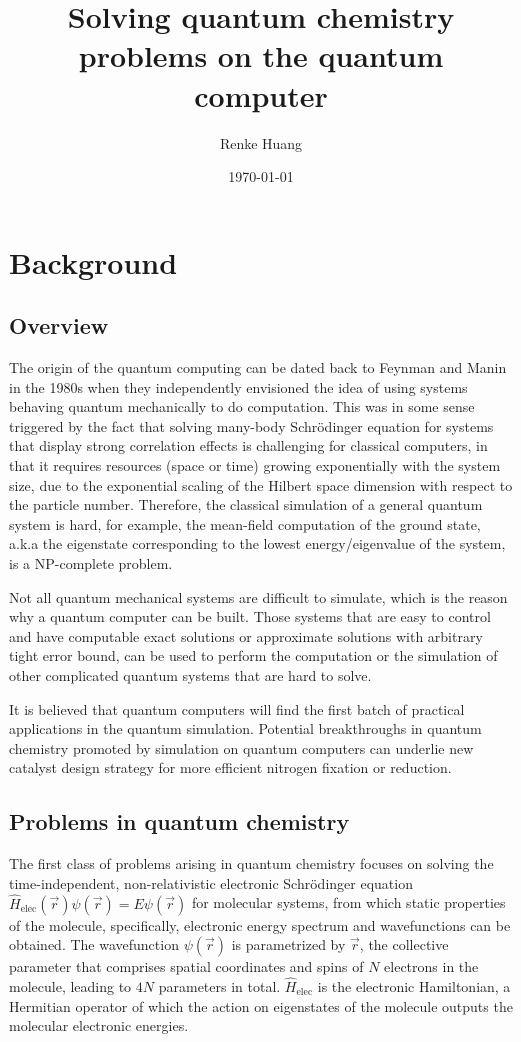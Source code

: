 \documentclass[journal=jctcce,manuscript=article]{achemso}
\author{Renke Huang}
\affiliation{Department of Chemistry and Cherry Emerson Center for Scientific Computation, Emory University}
\title{Solving quantum chemistry problems on the quantum computer}
\date{\today}
\begin{document}
\maketitle

\section{Background}

\subsection{Overview}
The origin of the quantum computing can be dated back to Feynman\cite{Feynman:1982gn} and Manin\cite{manin1980computable} in the 1980s when they independently envisioned the idea of using systems behaving quantum mechanically to do computation. 
This was in some sense triggered by the fact that solving many-body Schr\"{o}dinger equation for systems that display strong correlation effects is challenging\cite{Laughlin:2000br} for classical computers, in that it requires resources (space or time) growing exponentially with the system size, due to the exponential scaling of the Hilbert space dimension with respect to the particle number. Therefore, the classical simulation of a general quantum system is hard, for example, the mean-field computation of the ground state, a.k.a the eigenstate corresponding to the lowest energy/eigenvalue of the system, is a NP-complete problem.\cite{schuch2009computational}

Not all quantum mechanical systems are difficult to simulate, which is the reason why a quantum computer can be built. Those systems that are easy to control and have computable exact solutions or approximate solutions with arbitrary tight error bound, can be used to perform the computation or the simulation of other complicated quantum systems that are hard to solve.\cite{Georgescu:2014bg}

It is believed that quantum computers will find the first batch of practical applications in the quantum simulation. Potential breakthroughs in quantum chemistry promoted by simulation on quantum computers can underlie new catalyst design strategy for more efficient nitrogen fixation\cite{Reiher:2017cv} or  reduction.

\subsection{Problems in quantum chemistry}
The first class of problems arising in quantum chemistry focuses on solving the time-independent, non-relativistic electronic Schr\"{o}dinger equation $\hat{H}_{\mathrm{elec}}(\vec{r}) \psi(\vec{r})=E \psi(\vec{r})$ for molecular systems, from which static properties of the molecule, specifically, electronic energy spectrum and wavefunctions can be obtained. The wavefunction $\psi(\vec{r})$ is parametrized by $\vec{r}$, the collective parameter that comprises spatial coordinates and spins of $N$ electrons in the molecule, leading to $4N$ parameters in total. $\hat{H}_{\mathrm{elec}}$ is the electronic Hamiltonian, a Hermitian operator of which the action on eigenstates of the molecule outputs the molecular electronic energies.
\end{document}
